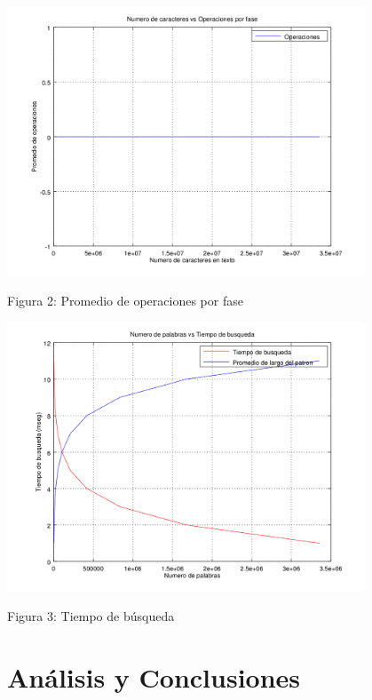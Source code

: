 \documentclass[letterpaper,10pt]{article}
\begin{document}
	\begin{center}
		\includegraphics[width=0.8\textwidth]{fig2.png}

		Figura 2: Promedio de operaciones por fase
	\end{center}

	\begin{center}
		\includegraphics[width=0.8\textwidth]{fig3.png}

		Figura 3: Tiempo de búsqueda
	\end{center}

	\newpage

	\section{Análisis y Conclusiones}
\end{document}
